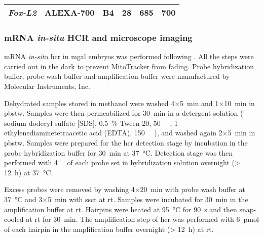 {\begin{longtable}[c]{llcccc}
		\textit{Fox-L2}                                              & ALEXA-700                                                        & B4                                                               & 28                                                                                     & 685                                                                                    & 700                                                                                  \\* \bottomrule \bottomrule
	\end{longtable}
}

\subsubsection{mRNA \textit{in-situ} HCR and microscope imaging}
mRNA \textit{in-situ} \gls{hcr} in \gls{mgal} embryos was performed following . All the steps were carried out in the dark to prevent MitoTracker from fading. Probe hybridization buffer, probe wash buffer and amplification buffer were manufactured by Molecular Instruments, Inc.

Dehydrated samples stored in methanol were washed 4×\qty{5}{\minute} and 1×\qty{10}{\minute} in \gls{pbstw}. Samples were then permeabilized for \qty{30}{\minute} in a detergent solution (\onepercent{} sodium dodecyl sulfate [SDS], \qty{0.5}{\percent} Tween 20, \qty{50}{\milli\molar} , \qty{1}{\milli\molar} ethylenediaminetetraacetic acid (EDTA), \qty{150}{\milli\molar} ), and washed again 2×\qty{5}{\minute} in \gls{pbstw}. Samples were prepared for the \gls{hcr} detection stage by incubation in the probe hybridization buffer for \qty{30}{\minute} at \qty{37}{\degreeCelsius}. Detection stage was then performed with \qty{4}{\nano\molar} of each probe set in hybridization solution overnight (\qty{> 12}{\hour}) at \qty{37}{\degreeCelsius}.

Excess probes were removed by washing 4×\qty{20}{\minute} with probe wash buffer at \qty{37}{\degreeCelsius} and 3×\qty{5}{\minute} with \gls{ssct} at \gls{rt}. Samples were incubated for \qty{30}{\minute} in the amplification buffer at \gls{rt}. Hairpins were heated at \qty{95}{\degreeCelsius} for \qty{90}{\second} and then snap-cooled at \gls{rt} for \qty{30}{\minute}. The amplification step of \gls{hcr} was performed with \qty{6}{\pmol} of each hairpin in the amplification buffer overnight (\qty{> 12}{\hour}) at \gls{rt}.

